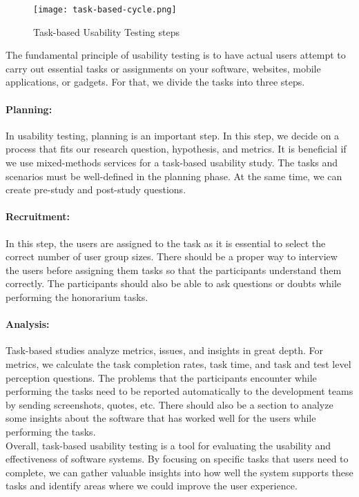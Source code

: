 \begin{figure}[htbp!]
  \centering    
  \texttt{[image: task-based-cycle.png]}
  \caption[Tasks steps]{Task-based Usability Testing steps}
  \label{fig:background:taskssteps}
\end{figure}
The fundamental principle of usability testing is to have actual users attempt to carry out essential tasks or assignments on your software, websites, mobile applications, or gadgets.
For that, we divide the tasks into three steps.
\paragraph{Planning:}
In usability testing, planning is an important step. 
In this step, we decide on a process that fits our research question, hypothesis, and metrics.  
It is beneficial if we use mixed-methods services for a task-based usability study.
The tasks and scenarios must be well-defined in the planning phase. At the same time, we can create pre-study and post-study questions. 
\paragraph{Recruitment:} 
In this step, the users are assigned to the task as it is essential to select the correct number of user group sizes.
There should be a proper way to interview the users before assigning them tasks so that the participants understand them correctly. 
The participants should also be able to ask questions or doubts while performing the honorarium tasks. 
\paragraph{Analysis:}
Task-based studies analyze metrics, issues, and insights in great depth.
For metrics, we calculate the task completion rates, task time, and task and test level perception questions.
The problems that the participants encounter while performing the tasks need to be reported automatically to the development teams by sending screenshots, quotes, etc. 
There should also be a section to analyze some insights about the software that has worked well for the users while performing the tasks.\\

Overall, task-based usability testing is a tool for evaluating the usability and effectiveness of software systems. 
By focusing on specific tasks that users need to complete, we can gather valuable insights into how well the system supports these tasks and identify areas where we could improve the user experience.
\clearpage

